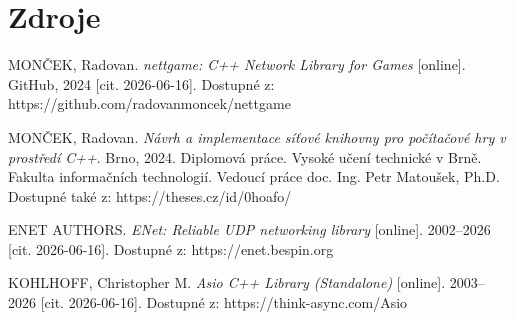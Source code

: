 \documentclass{article}
\begin{document}
\section{Zdroje}
\begin{thebibliography}[20]
    MONČEK, Radovan. \textit{nettgame: C++ Network Library for Games} [online]. GitHub, 2024 [cit. 2026-06-16]. Dostupné z: https://github.com/radovanmoncek/nettgame

    MONČEK, Radovan. \textit{Návrh a implementace síťové knihovny pro počítačové hry v prostředí C++}. Brno, 2024. Diplomová práce. Vysoké učení technické v Brně. Fakulta informačních technologií. Vedoucí práce doc. Ing. Petr Matoušek, Ph.D. Dostupné také z: https://theses.cz/id/0hoafo/

    ENET AUTHORS. \textit{ENet: Reliable UDP networking library} [online]. 2002–2026 [cit. 2026-06-16]. Dostupné z: https://enet.bespin.org

    KOHLHOFF, Christopher M. \textit{Asio C++ Library (Standalone)} [online]. 2003–2026 [cit. 2026-06-16]. Dostupné z: https://think-async.com/Asio






\end{thebibliography}
\end{document}
